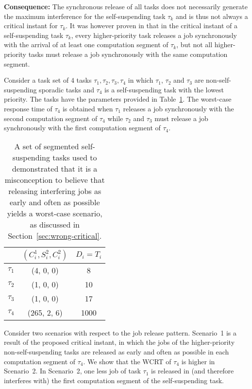 {\bf Consequence:}  The synchronous release of all tasks does not necessarily generate the maximum interference for the self-suspending task $\tau_k$ and is thus not always a critical instant for $\tau_k$. 
It was however proven in \cite{ecrts15nelissen} that in the critical instant of a self-suspending task $\tau_k$, every higher-priority task releases a job synchronously with the arrival of at least one computation segment of $\tau_k$, but not all higher-priority tasks must release a job synchronously with the same computation segment.


Consider a task set of $4$ tasks $\tau_1, \tau_2, \tau_3, \tau_4$ in which $\tau_1$, $\tau_2$ and $\tau_3$ are non-self-suspending sporadic tasks and $\tau_4$ is a self-suspending task with the lowest priority. The tasks have the parameters provided in Table~\ref{table:ex-num-releases}. The worst-case response time of $\tau_4$ is obtained when $\tau_1$ releases a job synchronously with the second computation segment of $\tau_4$ while $\tau_2$ and $\tau_3$ must release a job synchronously with the first computation segment of $\tau_4$.

\begin{table}[t]
\centering
    \begin{tabular}{|c|c|c|}
 \hline
        & $(C_i^1, S_i^2, C_i^2)$ &  $D_i=T_i$\\ 
        \hline
        $\tau_1$ & (4, 0, 0) &  8\\ 
        $\tau_2$ &  (1, 0, 0) & 10 \\ 
        $\tau_3$ & (1, 0, 0) & 17 \\
        $\tau_4$ & (265, 2, 6) & 1000\\
        \hline
    \end{tabular} 
    \caption{A set of segmented self-suspending tasks used to  demonstrated that it is a misconception to believe that releasing interfering jobs as early and often as possible yields a worst-case scenario, as discussed in Section~\ref{sec:wrong-critical}. }
    \label{table:ex-num-releases}
\end{table}

Consider two scenarios with respect to the job release pattern. Scenario~1 is a result of the proposed critical instant, in which the jobs of the higher-priority non-self-suspending tasks are released as early and often as possible in each computation segment of $\tau_4$. We show that the WCRT of $\tau_4$  is higher in Scenario~2.
 In Scenario~2, one less job of task $\tau_1$ is released in (and therefore interferes with) the first computation segment of the self-suspending task.


